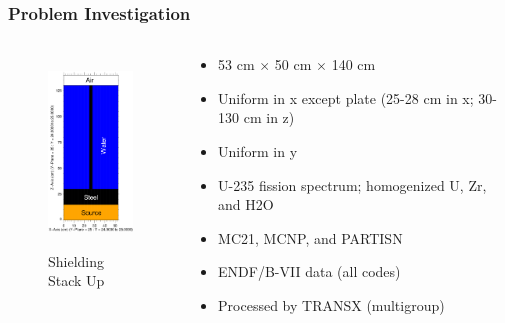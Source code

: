 \documentclass[xcolor=x11names,compress]{beamer}
\renewcommand{\(}{\begin{columns}}
\renewcommand{\)}{\end{columns}}
\newcommand{\<}[1]{\begin{column}{#1}}
\renewcommand{\>}{\end{column}}
\begin{document}
\begin{frame}[fragile]
  \frametitle{Problem Investigation}
  	\begin{columns}
  	\begin{column}{0.45\textwidth}
  	\begin{figure}
  		\includegraphics[height=2in,clip]{plate-geometry}
  		\caption{Shielding Stack Up}
  	\end{figure}
  	\end{column}
 	\begin{column}{0.6\textwidth}
	\begin{itemize}
	\item 53 cm $\times$ 50 cm $\times$ 140 cm 
	\item Uniform in x except plate (25-28 cm in x; 30-130 cm in z)
	\item Uniform in y
	\item U-235 fission spectrum; homogenized U, Zr, and H2O
	\vspace*{1 em}
	\item MC21, MCNP, and PARTISN
	\item ENDF/B-VII data (all codes)
	\item Processed by TRANSX (multigroup)
	\end{itemize}
  	\end{column}
	\end{columns}
  
\end{frame}
\end{document}
